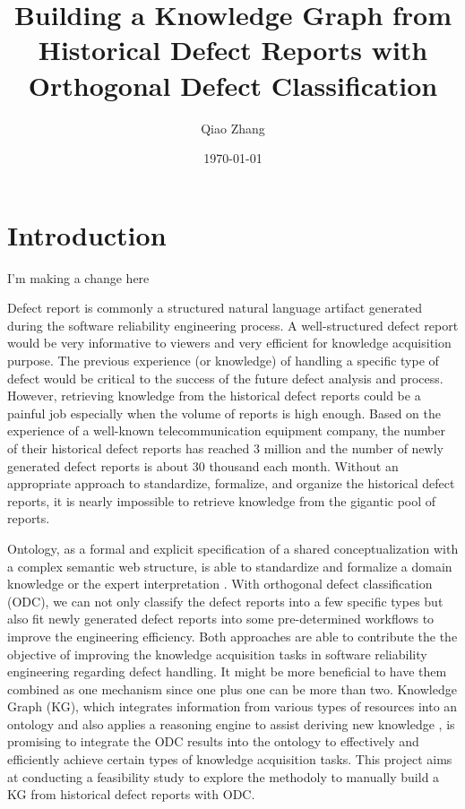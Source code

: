 \documentclass[12pt] {article}
\begin{document}
\title{Building a Knowledge Graph from Historical Defect Reports with Orthogonal Defect Classification}
\author{Qiao Zhang}
\date \today
\maketitle

\thispagestyle{empty}

\bigskip
\pagebreak
\setcounter{page}{1}
\section{Introduction}
I'm making a change here

Defect report is commonly a structured natural language artifact generated during the software reliability engineering process.
A well-structured defect report would be very informative to viewers and very efficient for knowledge acquisition purpose.
The previous experience (or knowledge) of handling a specific type of defect would be critical to the success of the future defect analysis and process.
However, retrieving knowledge from the historical defect reports could be a painful job especially when the volume of reports is high enough.
Based on the experience of a well-known telecommunication equipment company, the number of their historical defect reports has reached 3 million and the number of newly generated defect reports is about 30 thousand each month.
Without an appropriate approach to standardize, formalize, and organize the historical defect reports, it is nearly impossible to retrieve knowledge from the gigantic pool of reports.\par

Ontology, as a formal and explicit specification of a shared conceptualization with a complex semantic web structure, is able to standardize and formalize a domain knowledge or the expert interpretation \cite{christina2016an}.
With orthogonal defect classification (ODC), we can not only classify the defect reports into a few specific types but also fit newly generated defect reports into some pre-determined workflows to improve the engineering efficiency.
Both approaches are able to contribute the the objective of improving the knowledge acquisition tasks in software reliability engineering regarding defect handling. 
It might be more beneficial to have them combined as one mechanism since one plus one can be more than two.
Knowledge Graph (KG), which integrates information from various types of resources into an ontology and also applies a reasoning engine to assist deriving new knowledge \cite{ehrlinger2016towards}, is promising to integrate the ODC results into the ontology to effectively and efficiently achieve certain types of knowledge acquisition tasks.
This project aims at conducting a feasibility study to explore the methodoly to manually build a KG from historical defect reports with ODC.
\end{document}
